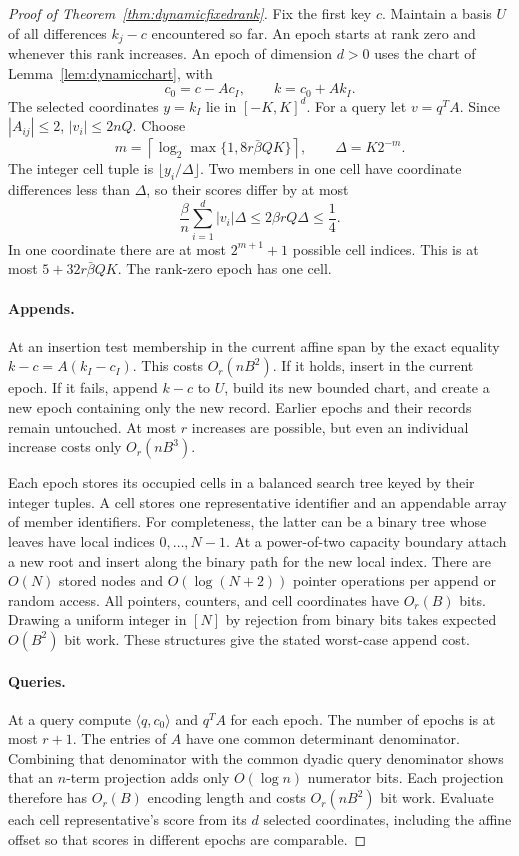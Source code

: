 \begin{proof}[Proof of Theorem~\ref{thm:dynamicfixedrank}]
Fix the first key $c$.  Maintain a basis $U$ of all differences
$k_j-c$ encountered so far.  An epoch starts at rank zero and
whenever this rank increases.  An epoch of dimension $d>0$
uses the chart of Lemma~\ref{lem:dynamicchart}, with
\[
 c_0=c-Ac_I,\qquad k=c_0+Ak_I.
\]
The selected coordinates $y=k_I$ lie in $[-K,K]^d$.
For a query let $v=q^TA$.  Since $|A_{ij}|\le2$,
$|v_i|\le2nQ$.  Choose
\[
 m=\left\lceil\log_2\max\{1,8r\bar\beta QK\}\right\rceil,
 \qquad \Delta=K2^{-m}.
\]
The integer cell tuple is $\lfloor y_i/\Delta\rfloor$.
Two members in one cell have coordinate differences less than
$\Delta$, so their scores differ by at most
\[
 \frac\beta n\sum_{i=1}^d|v_i|\Delta
 \le2\beta rQ\Delta\le\frac14.
\]
In one coordinate there are at most $2^{m+1}+1$ possible cell
indices.  This is at most $5+32r\bar\beta QK$.
The rank-zero epoch has one cell.

\paragraph{Appends.}
At an insertion test membership in the current affine span by
the exact equality $k-c=A(k_I-c_I)$.  This costs $O_r(nB^2)$.
If it holds, insert in the current epoch.  If it fails, append
$k-c$ to $U$, build its new bounded chart, and create a new
epoch containing only the new record.  Earlier epochs and their
records remain untouched.  At most $r$ increases are possible,
but even an individual increase costs only $O_r(nB^3)$.

Each epoch stores its occupied cells in a balanced search tree
keyed by their integer tuples.  A cell stores one representative
identifier and an appendable array of member identifiers.
For completeness, the latter can be a binary tree whose leaves
have local indices $0,\ldots,N-1$.  At a power-of-two capacity
boundary attach a new root and insert along the binary path
for the new local index.  There are $O(N)$ stored nodes and
$O(\log(N+2))$ pointer operations per append or random access.
All pointers, counters, and cell coordinates have $O_r(B)$
bits.  Drawing a uniform integer in $[N]$ by rejection from
binary bits takes expected $O(B^2)$ bit work.  These structures
give the stated worst-case append cost.

\paragraph{Queries.}
At a query compute $\langle q,c_0\rangle$ and $q^TA$ for each
epoch.  The number of epochs is at most $r+1$.  The entries of
$A$ have one common determinant denominator.  Combining that
denominator with the common dyadic query denominator shows that
an $n$-term projection adds only $O(\log n)$ numerator bits.
Each projection therefore has $O_r(B)$ encoding length and
costs $O_r(nB^2)$ bit work.  Evaluate each cell representative's
score from its $d$ selected coordinates, including the affine
offset so that scores in different epochs are comparable.


\end{proof}
